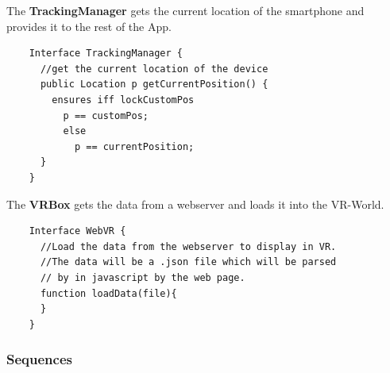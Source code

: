     The \textbf{TrackingManager} gets the current location of the smartphone and provides it to the rest of
    the App.

    \begin{lstlisting}
    Interface TrackingManager {
      //get the current location of the device
      public Location p getCurrentPosition() {
        ensures iff lockCustomPos
          p == customPos;
          else
            p == currentPosition;
      }
    }
    \end{lstlisting}


    The \textbf{VRBox} gets the data from a webserver and loads it into the VR-World.

    \begin{lstlisting}
    Interface WebVR {
      //Load the data from the webserver to display in VR.
      //The data will be a .json file which will be parsed
      // by in javascript by the web page.
      function loadData(file){
      }
    }
    \end{lstlisting}

\subsubsection{Sequences}

